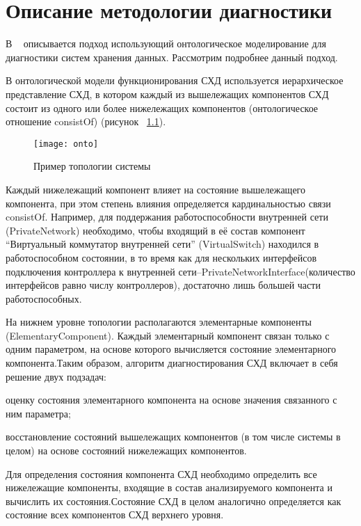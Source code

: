 \chapter{Описание методологии диагностики}
В ~\cite{ontoapproach} описывается подход использующий онтологическое моделирование для диагностики систем хранения данных. Рассмотрим подробнее данный подход. 

В  онтологической  модели  функционирования СХД используется иерархическое представление СХД, в котором каждый из вышележащих компонентов СХД состоит из одного или более нижележащих компонентов (онтологическое отношение consistOf) (рисунок ~\ref{fig:onto}).
\begin{figure}[h]
	\centering
	\texttt{[image: onto]}
	\caption{Пример топологии системы}
	\label{fig:onto}
\end{figure}

Каждый нижележащий компонент влияет на  состояние  вышележащего  компонента,  при  этом  степень  влияния определяется кардинальностью связи consistOf. Например, для поддержания работоспособности внутренней сети (PrivateNetwork) необходимо,  чтобы входящий  в  её  состав  компонент “Виртуальный коммутатор  внутренней  сети”  (VirtualSwitch)  находился  в  работоспособном состоянии,  в  то  время  как  для  нескольких  интерфейсов  подключения контроллера  к  внутренней  сети–PrivateNetworkInterface(количество интерфейсов  равно  числу  контроллеров),  достаточно  лишь  большей  части работоспособных.

На нижнем  уровне  топологии  располагаются  элементарные компоненты  (ElementaryComponent).  Каждый  элементарный  компонент связан  только  с  одним  параметром,  на  основе  которого вычисляется состояние элементарного компонента.Таким  образом,  алгоритм  диагностирования СХД включает  в  себя решение двух подзадач:
\begin{itemize*}
	\item{оценку состояния  элементарного  компонента  на  основе  значения связанного с ним параметра;}
	\item{восстановление состояний вышележащих компонентов (в том числе системы в целом) на основе состояний нижележащих компонентов.}
\end{itemize*}
Для определения состояния компонента СХД необходимо определить все  нижележащие  компоненты,  входящие  в  состав  анализируемого компонента и вычислить их состояния.Состояние СХД в целом аналогично определяется как состояние всех компонентов СХД верхнего уровня.

